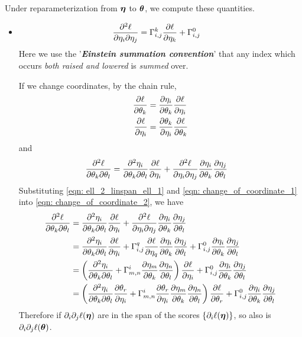 \documentclass[11pt]{article}
\begin{document}
Under reparameterization from $\boldsymbol{\eta}$ to $\boldsymbol{\theta}$, we compute these quantities. 
\begin{itemize}
\item
\begin{align}
\frac{\partial^2\ell }{\partial \eta_{i} \partial \eta_{j}} &= \Gamma_{i,j}^{k}\frac{\partial \ell}{ \partial \eta_{k}} +  \Gamma_{i,j}^{0} \label{eqn: ell_2_linspan_ell_1}
\end{align} Here we use the '\emph{\textbf{Einstein summation convention}}' that any index which occurs \emph{both raised and lowered} is \emph{summed} over. 

If we change coordinates, by the chain rule,
\begin{align}
\frac{\partial \ell}{ \partial \theta_k} &= \frac{\partial \eta_i}{ \partial \theta_k}\frac{\partial \ell}{ \partial \eta_i} \nonumber\\
\frac{\partial \ell}{ \partial \eta_i} &= \frac{\partial \theta_k}{ \partial \eta_i}\frac{\partial \ell}{ \partial \theta_k} \label{eqn: change_of_coordinate_1}
\end{align} and
\begin{align}
\frac{\partial^2\ell}{\partial \theta_k \partial \theta_{l}} &= \frac{\partial^2\eta_i}{\partial \theta_k \partial \theta_{l}} \frac{\partial \ell}{ \partial \eta_{i}}  + \frac{\partial^2\ell }{\partial \eta_{i} \partial \eta_{j}} \frac{\partial \eta_{i}}{ \partial \theta_k}\frac{\partial \eta_{j}}{ \partial \theta_l} \label{eqn: change_of_coordinate_2}
\end{align} Substituting \eqref{eqn: ell_2_linspan_ell_1} and \eqref{eqn: change_of_coordinate_1} into \eqref{eqn: change_of_coordinate_2}, we have 
\begin{align*}
\frac{\partial^2\ell}{\partial \theta_k \partial \theta_{l}} &= \frac{\partial^2\eta_i}{\partial \theta_k \partial \theta_{l}} \frac{\partial \ell}{ \partial \eta_{i}}  + \frac{\partial^2\ell }{\partial \eta_{i} \partial \eta_{j}} \frac{\partial \eta_{i}}{ \partial \theta_k}\frac{\partial \eta_{j}}{ \partial \theta_l} \\
&=  \frac{\partial^2\eta_i}{\partial \theta_k \partial \theta_{l}} \frac{\partial \ell}{ \partial \eta_{i}}  +  \Gamma_{i,j}^{q}\frac{\partial \ell}{ \partial \eta_{q}}  \frac{\partial \eta_{i}}{ \partial \theta_k}\frac{\partial \eta_{j}}{ \partial \theta_l} +  \Gamma_{i,j}^{0}\frac{\partial \eta_{i}}{ \partial \theta_k}\frac{\partial \eta_{j}}{ \partial \theta_l} \\
&= \left(\frac{\partial^2\eta_i}{\partial \theta_k \partial \theta_{l}} + \Gamma_{m,n}^{i}\frac{\partial \eta_{m}}{ \partial \theta_k}\frac{\partial \eta_{n}}{ \partial \theta_l}\right)\frac{\partial \ell}{ \partial \eta_{i}} +  \Gamma_{i,j}^{0}\frac{\partial \eta_{i}}{ \partial \theta_k}\frac{\partial \eta_{j}}{ \partial \theta_l} \\
&= \left(\frac{\partial^2\eta_i}{\partial \theta_k \partial \theta_{l}}\frac{\partial \theta_r}{ \partial \eta_i} + \Gamma_{m,n}^{i}\frac{\partial \theta_r}{ \partial \eta_i}\frac{\partial \eta_{m}}{ \partial \theta_k}\frac{\partial \eta_{n}}{ \partial \theta_l}\right)\frac{\partial \ell}{ \partial \theta_{r}} +  \Gamma_{i,j}^{0}\frac{\partial \eta_{i}}{ \partial \theta_k}\frac{\partial \eta_{j}}{ \partial \theta_l} \\
\end{align*} Therefore if $\partial_i \partial_j \ell(\boldsymbol{\eta})$ are in the span of the scores $\left\{\partial_i  \ell(\boldsymbol{\eta})\right\}$, so also is $\partial_i \partial_j \ell(\boldsymbol{\theta})$.


\end{itemize}
\end{document}
